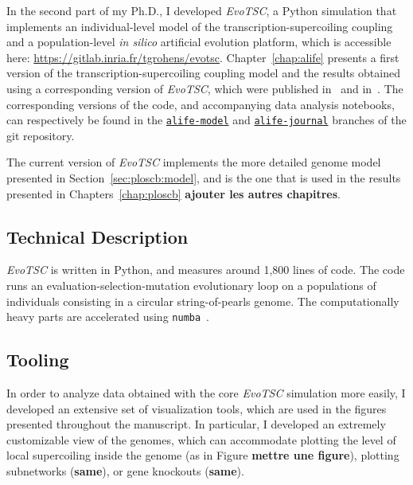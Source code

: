 In the second part of my Ph.D., I developed \emph{EvoTSC}, a Python simulation that implements an individual-level model of the transcription-supercoiling coupling and a population-level \emph{in silico} artificial evolution platform, which is accessible here: \url{https://gitlab.inria.fr/tgrohens/evotsc}.
Chapter~\ref{chap:alife} presents a first version of the transcription-supercoiling coupling model and the results obtained using a corresponding version of \emph{EvoTSC}, which were published in~\cite{grohens2021} and in~\cite{grohens2022a}.
The corresponding versions of the code, and accompanying data analysis notebooks, can respectively be found in the \href{https://gitlab.inria.fr/tgrohens/evotsc/-/tree/alife-model}{\texttt{alife-model}} and \href{https://gitlab.inria.fr/tgrohens/evotsc/-/tree/alife-journal}{\texttt{alife-journal}} branches of the git repository.

The current version of \emph{EvoTSC} implements the more detailed genome model presented in Section~\ref{sec:ploscb:model}, and is the one that is used in the results presented in Chapters~\ref{chap:ploscb} \textbf{ajouter les autres chapitres}.

\subsection{Technical Description}

\emph{EvoTSC} is written in Python, and measures around 1,800 lines of code.
The code runs an evaluation-selection-mutation evolutionary loop on a populations of individuals consisting in a circular string-of-pearls genome.
The computationally heavy parts are accelerated using \texttt{numba}~\citep{lam2015}.

%

\subsection{Tooling}

In order to analyze data obtained with the core \emph{EvoTSC} simulation more easily, I developed an extensive set of visualization tools, which are used in the figures presented throughout the manuscript.
In particular, I developed an extremely customizable view of the genomes, which can accommodate plotting the level of local supercoiling inside the genome (as in Figure \textbf{mettre une figure}), plotting subnetworks (\textbf{same}), or gene knockouts (\textbf{same}).


%
